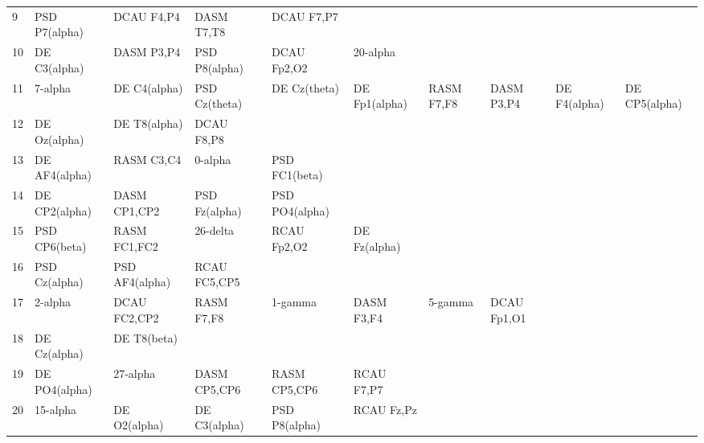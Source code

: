 \begin{landscape}
\begin{table}[]
\begin{tabular}{l|llllllll}
9        & PSD P7(alpha)  & DCAU F4,P4     & DASM T7,T8     & DCAU F7,P7     &                &                &               &                &               &               \\
10       & DE C3(alpha)   & DASM P3,P4     & PSD P8(alpha)  & DCAU Fp2,O2    & 20-alpha       &                &               &                &               &               \\
11       & 7-alpha        & DE C4(alpha)   & PSD Cz(theta)  & DE Cz(theta)   & DE Fp1(alpha)  & RASM F7,F8     & DASM P3,P4    & DE F4(alpha)   & DE CP5(alpha) &               \\
12       & DE Oz(alpha)   & DE T8(alpha)   & DCAU F8,P8     &                &                &                &               &                &               &               \\
13       & DE AF4(alpha)  & RASM C3,C4     & 0-alpha        & PSD FC1(beta)  &                &                &               &                &               &               \\
14       & DE CP2(alpha)  & DASM CP1,CP2   & PSD Fz(alpha)  & PSD PO4(alpha) &                &                &               &                &               &               \\
15       & PSD CP6(beta)  & RASM FC1,FC2   & 26-delta       & RCAU Fp2,O2    & DE Fz(alpha)   &                &               &                &               &               \\
16       & PSD Cz(alpha)  & PSD AF4(alpha) & RCAU FC5,CP5   &                &                &                &               &                &               &               \\
17       & 2-alpha        & DCAU FC2,CP2   & RASM F7,F8     & 1-gamma        & DASM F3,F4     & 5-gamma        & DCAU Fp1,O1   &                &               &               \\
18       & DE Cz(alpha)   & DE T8(beta)    &                &                &                &                &               &                &               &               \\
19       & DE PO4(alpha)  & 27-alpha       & DASM CP5,CP6   & RASM CP5,CP6   & RCAU F7,P7     &                &               &                &               &               \\
20       & 15-alpha       & DE O2(alpha)   & DE C3(alpha)   & PSD P8(alpha)  & RCAU Fz,Pz     &                &               &                &               &               \\

\end{tabular}
\end{table}
\end{landscape}
